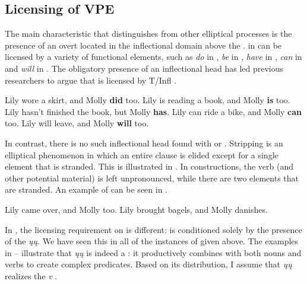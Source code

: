 \documentclass[output=paper]{LSP/langsci}
\begin{document}
\subsection{Licensing of VPE}\label{sec:johnson:2.2}

The main characteristic that distinguishes  from other elliptical processes is the presence of an overt  located in the inflectional domain above the .  in  can be licensed by a variety of functional elements, such as \emph{do} in , \emph{be} in , \emph{have} in , \emph{can} in  and \emph{will} in . The obligatory presence of an inflectional head has led previous researchers to argue that  is licensed by T/Infl \citep{Bresnan1976,Sag1976,Zagona1988,Lobeck1995}.

 
\ea\label{ex:johnson:12}
\ea\label{ex:johnson:12a}
Lily wore a skirt, and Molly \textbf{did} too.
\ex\label{ex:johnson:12b}
Lily is reading a book, and Molly \textbf{is} too.
\ex\label{ex:johnson:12c}
Lily hasn't finished the book, but Molly \textbf{has}.
\ex\label{ex:johnson:12d}
Lily can ride a bike, and Molly \textbf{can} too.
\ex\label{ex:johnson:12e} 
Lily will leave, and Molly \textbf{will} too.
\z
\z

In contrast, there is no such inflectional head found with  or . Stripping is an elliptical phenomenon in which an entire clause is elided except for a single element that is stranded. This is illustrated in . In  constructions, the verb (and other potential material) is left unpronounced, while there are two elements that are stranded. An example of  can be seen in .
 
\ea\label{ex:johnson:13}
\ea\label{ex:johnson:13a}
Lily came over, and Molly too.
\ex\label{ex:johnson:13b} 
Lily brought bagels, and Molly danishes.
\z
\z

In , the licensing requirement on  is different:  is conditioned solely by the presence of the  \emph{ųų}. We have seen this in all of the instances of  given above. The examples in -- illustrate that \emph{ųų} is indeed a : it productively combines with both nouns and verbs to create complex predicates. Based on its distribution, I assume that \emph{ųų} realizes the  \emph{v} \citep[Examples 14--18]{Hartmann2012}.
 
\end{document}
